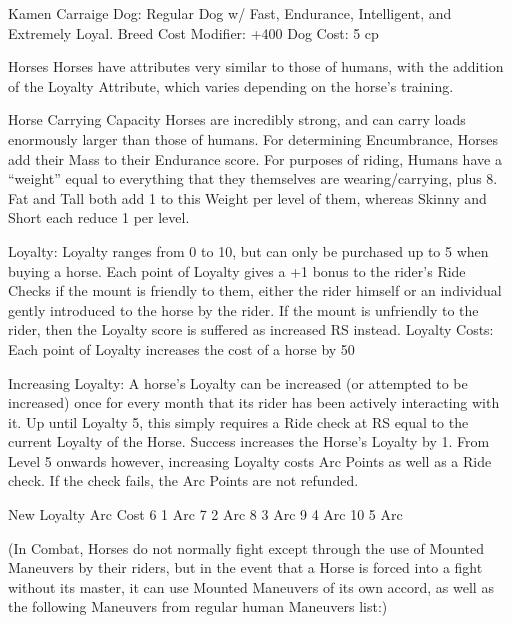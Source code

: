 \documentclass[oneside,11pt,english]{book}
\begin{document}
Kamen Carraige Dog: Regular Dog w/ Fast, Endurance, Intelligent, and Extremely Loyal. 
Breed Cost Modifier: +400%
Dog Cost: 5 cp 

 

 

 

Horses 
Horses have attributes very similar to those of humans, with the addition of the Loyalty Attribute, which 
varies depending on the horse’s training. 

 

Horse Carrying Capacity 
Horses are incredibly strong, and can carry loads enormously larger than those of humans. For 
determining Encumbrance, Horses add their Mass to their Endurance score. 
For purposes of riding, Humans have a “weight” equal to everything that they themselves are 
wearing/carrying, plus 8. Fat and Tall both add 1 to this Weight per level of them, whereas Skinny and 
Short each reduce 1 per level. 

 

Loyalty: Loyalty ranges from 0 to 10, but can only be purchased up to 5 when buying a horse. Each point 
of Loyalty gives a +1 bonus to the rider’s Ride Checks if the mount is friendly to them, either the rider 
himself or an individual gently introduced to the horse by the rider. If the mount is unfriendly to the rider, 
then the Loyalty score is suffered as increased RS instead. 
Loyalty Costs: Each point of Loyalty increases the cost of a horse by 50%

 

Increasing Loyalty: A horse’s Loyalty can be increased (or attempted to be increased) once for every 
month that its rider has been actively interacting with it. Up until Loyalty 5, this simply requires a Ride 
check at RS equal to the current Loyalty of the Horse. Success increases the Horse’s Loyalty by 1. 
From Level 5 onwards however, increasing Loyalty costs Arc Points as well as a Ride check. If the check 
fails, the Arc Points are not refunded. 

 

 

New Loyalty Arc Cost 
6 1 Arc 
7 2 Arc 
8 3 Arc 
9 4 Arc 
10 5 Arc 

 
(In Combat, Horses do not normally fight except through the use of Mounted Maneuvers by their riders, 
but in the event that a Horse is forced into a fight without its master, it can use Mounted Maneuvers of its 
own accord, as well as the following Maneuvers from regular human Maneuvers list:) 
\end{document}
